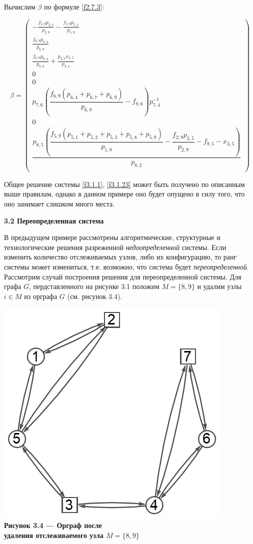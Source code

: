 \documentclass[14pt]{extarticle}%
\begin{document}
Вычислим $\beta$ по формуле \eqref{f2.7.3}:

\begin{equation}
	\beta=\left(
\begin{array}{c}
 -\frac{f_{2,9} p_{2,1}}{p_{2,9}}-\frac{f_{5,9} p_{5,1}}{p_{5,9}} \\
 \frac{f_{6,9} p_{6,4}}{p_{6,9}} \\
 \frac{f_{6,9} p_{6,4}}{p_{6,9}}+\frac{p_{3,5} x_{3,5}}{p_{3,4}} \\
 0 \\
 0 \\
p_{7,6} \left(\dfrac{f_{6,9} \left(p_{6,4}+p_{6,7}+p_{6,9}\right)}{p_{6,9}}-f_{9,6}\right)p_{7,4}^{-1} \\
 0 \\
 \dfrac{p_{8,5} \left(\dfrac{f_{5,9} \left(p_{5,1}+p_{5,2}+p_{5,3}+p_{5,8}+p_{5,9}\right)}{p_{5,9}}-\dfrac{f_{2,9} p_{2,5}}{p_{2,9}}-f_{9,5}-x_{3,5}\right)}{p_{8,2}} \\
\end{array}
\right)
\end{equation}

Общее решение системы \eqref{f3.1.1}, \eqref{f3.1.23} может быть получено по описанным выше правилам, однако в данном примере оно будет опущено в силу того, что оно занимает слишком много места.


\textbf{3.2 Переопределенная система}

В предыдущем примере рассмотрены алгоритмические, структурные и технологические решения разреженной {\it недоопределенной} системы. Если изменить количество отслеживаемых узлов, либо их конфигурацию, то ранг системы может измениться, т.е. возможно, что система будет {\it переопределенной}. Рассмотрим случай построения решения для переопределенной системы. Для графа $G$, пердставленного на рисунке 3.1 положим $M=\{8,9\}$ и удалим узлы $i\in M$ из орграфа $G$ (см. рисунок 3.4).

\begin{center}
\includegraphics[scale=0.6]{grs/s2g1.png}\\
\textbf{Рисунок 3.4 ---  Орграф после \\удаления отслеживаемого узла $M=\{8,9\}$}
\end{center}
\end{document}

